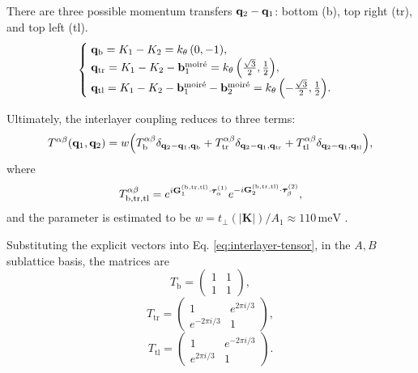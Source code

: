There are three possible momentum transfers ${\vb{q}}_2-{\vb{q}}_1$: bottom (b), top right (tr), and top left (tl).
\begin{equation} \label{eq:qb_qtr_qtl}
\begin{cases}
\; {\vb{q}}_\text{b} = K_1 - K_2 = k_\theta \, (0, -1), \\
\; {\vb{q}}_\text{tr} = K_1 - K_2 - {\vb{b}}_1^{\text{moiré}} = k_\theta \, \qty(\frac{\sqrt{3}}{2}, \frac{1}{2}), \\
\; {\vb{q}}_\text{tl} = K_1 - K_2 -{\vb{b}}_1^{\text{moiré}}-{\vb{b}}_2^{\text{moiré}} = k_\theta \, \qty(-\frac{\sqrt{3}}{2}, \frac{1}{2}).
\end{cases}
\end{equation}

Ultimately, the interlayer coupling reduces to three terms:
\begin{equation} \label{eq:interlayer-3terms}
T^{\alpha\beta}({\vb{q}}_1, {\vb{q}}_2) = w \qty(T^{\alpha\beta}_{\text{b}} \delta_{{\vb{q}}_2 - {\vb{q}}_1, {\vb{q}}_\text{b}}
+ T^{\alpha\beta}_{\text{tr}} \delta_{{\vb{q}}_2 - {\vb{q}}_1, {\vb{q}}_\text{tr}}
+ T^{\alpha\beta}_{\text{tl}} \delta_{{\vb{q}}_2 - {\vb{q}}_1, {\vb{q}}_\text{tl}}),
\end{equation}
where
\begin{equation} \label{eq:interlayer-tensor}
T^{\alpha\beta}_{\text{b},\text{tr},\text{tl}} = e^{i {\vb{G}}_{1}^{(\text{b},\text{tr},\text{tl})} \cdot {\bm{\tau}}_{\alpha}^{(1)}}
e^{-i {\vb{G}}_{2}^{(\text{b},\text{tr},\text{tl})} \cdot {\bm{\tau}}_{\beta}^{(2)}},
\end{equation}
and the parameter is estimated to be \( w = t_\perp(|\mathbf{K}|) / A_1 \approx 110 \, \mathrm{meV} \) \cite{macdonald2011}.

Substituting the explicit vectors into Eq. \eqref{eq:interlayer-tensor}, in the \( A, B \) sublattice basis, the matrices are
\begin{equation} \label{eq:T-qb}
T_{\text{b}} =
\begin{pmatrix}
1 & 1 \\
1 & 1
\end{pmatrix},
\end{equation}
\begin{equation} \label{eq:T-qtr}
T_{\text{tr}} =
\begin{pmatrix}
1 & e^{2\pi i/3} \\
e^{-2\pi i/3} & 1
\end{pmatrix},
\end{equation}
\begin{equation} \label{eq:T-qtl}
T_{\text{tl}} =
\begin{pmatrix}
1 & e^{-2\pi i/3} \\
e^{2\pi i/3} & 1
\end{pmatrix}.
\end{equation}

